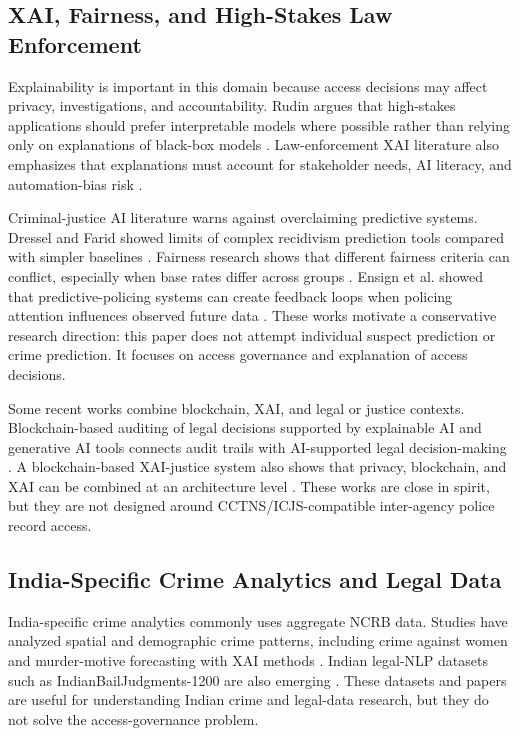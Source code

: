 \subsection{XAI, Fairness, and High-Stakes Law Enforcement}

Explainability is important in this domain because access decisions may affect privacy, investigations, and accountability. Rudin argues that high-stakes applications should prefer interpretable models where possible rather than relying only on explanations of black-box models \cite{rudin_2019}. Law-enforcement XAI literature also emphasizes that explanations must account for stakeholder needs, AI literacy, and automation-bias risk \cite{zocholl_xai_law_enforcement_2025}.

Criminal-justice AI literature warns against overclaiming predictive systems. Dressel and Farid showed limits of complex recidivism prediction tools compared with simpler baselines \cite{dressel_fairness_limits_2018}. Fairness research shows that different fairness criteria can conflict, especially when base rates differ across groups \cite{chouldechova_2017,kleinberg_tradeoffs_2016}. Ensign et al. showed that predictive-policing systems can create feedback loops when policing attention influences observed future data \cite{ensign_feedback_2018}. These works motivate a conservative research direction: this paper does not attempt individual suspect prediction or crime prediction. It focuses on access governance and explanation of access decisions.

Some recent works combine blockchain, XAI, and legal or justice contexts. Blockchain-based auditing of legal decisions supported by explainable AI and generative AI tools connects audit trails with AI-supported legal decision-making \cite{sachan_legal_ai_blockchain_2024}. A blockchain-based XAI-justice system also shows that privacy, blockchain, and XAI can be combined at an architecture level \cite{demertzis_xai_justice_2023}. These works are close in spirit, but they are not designed around CCTNS/ICJS-compatible inter-agency police record access.

\subsection{India-Specific Crime Analytics and Legal Data}

India-specific crime analytics commonly uses aggregate NCRB data. Studies have analyzed spatial and demographic crime patterns, including crime against women and murder-motive forecasting with XAI methods \cite{sharma_india_crime_2023,naick_murder_xai_2024,reza_crix_2025}. Indian legal-NLP datasets such as IndianBailJudgments-1200 are also emerging \cite{deshmukh_bail_2025}. These datasets and papers are useful for understanding Indian crime and legal-data research, but they do not solve the access-governance problem.

